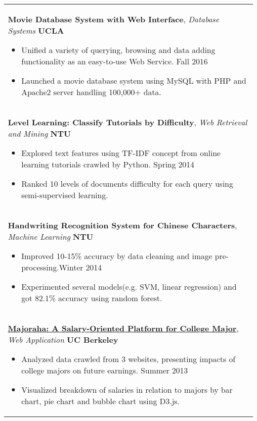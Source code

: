 \documentclass[a4paper,11pt]{article} %
\begin{document}
{\begin{tabular}{p{18.5cm}}
{\bf{Movie Database System with Web Interface}}, {\it{Database Systems}} \hfill {\bf{UCLA}}
\begin{itemize}
\item Unified a variety of querying, browsing and data adding functionality as an easy-to-use Web Service. \hfill Fall 2016
\item Launched a movie database system using MySQL with PHP and Apache2 server handling 100,000+ data.\vspace*{-\baselineskip}
\end{itemize} \\
\vspace{0.1mm}

{\bf{Level Learning: Classify Tutorials by Difficulty}}, {\it{Web Retrieval and Mining}} \hfill {\bf{NTU}}
\begin{itemize}
\item Explored text features using TF-IDF concept from online learning tutorials crawled by Python. \hfill Spring 2014
\item Ranked 10 levels of documents difficulty for each query using semi-supervised learning.\vspace*{-\baselineskip}
\end{itemize}\\
\vspace{.1mm}

{\bf{Handwriting Recognition System for Chinese Characters}}, {\it{Machine Learning}} \hfill \textbf{NTU}
\begin{itemize}
\item Improved 10-15\% accuracy by data cleaning and image pre-processing.\hfill Winter 2014
\item Experimented several models(e.g. SVM, linear regression) and got 82.1\% accuracy using random forest.\vspace*{-\baselineskip}
\end{itemize}\\
\vspace{.1mm}

{\bf{\href{http://people.ischool.berkeley.edu/~charleswang/i153/final/facetBrowser/index.html}{Majoraha: A Salary-Oriented Platform for College Major}}}, {\it{Web Application}} \hfill {\bf{UC Berkeley}}
\begin{itemize}
\item Analyzed data crawled from 3 websites, presenting impacts of college majors on future earnings. \hfill Summer 2013
\item Visualized breakdown of salaries in relation to majors by bar chart, pie chart and bubble chart using D3.js. \vspace*{-\baselineskip}
\end{itemize}\\


\end{tabular}}
\end{document}
